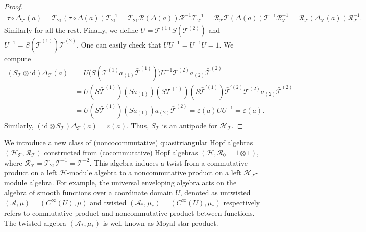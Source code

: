 \documentclass[reqno]{amsart}
\theoremstyle{definition}
\theoremstyle{remark}
\begin{document}
\begin{proof}
\begin{equation}
\begin{split}
            \tau \circ \Delta_\mathcal{T} (a) = \mathcal{T}_{21} (\tau \circ\Delta(a))\mathcal{T}_{21}^{-1} = \mathcal{T}_{21}\mathcal{R}(\Delta(a))\mathcal{R}^{-1} \mathcal{T}_{21}^{-1} = \mathcal{R}_\mathcal{T}\mathcal{T}(\Delta(a))\mathcal{T}^{-1}\mathcal{R}_\mathcal{T}^{-1} = \mathcal{R}_\mathcal{T}(\Delta_\mathcal{T}(a))\mathcal{R}_\mathcal{T}^{-1}.
        \end{split}
    \end{equation}
    Similarly for all the rest. Finally, we define $U=\mathcal{T}^{(1)} S\left(\mathcal{T}^{(2)}\right)$ and $U^{-1}=S\left(\bar{\mathcal{T}}^{(1)}\right) \bar{\mathcal{T}}^{(2)}$. One can easily check that $UU^{-1}=U^{-1}U=1$. We compute
    \begin{equation}
\begin{split}
 (S_{\mathcal{T}}\otimes \textrm{id})\Delta_{\mathcal{T}}(a)
&= U\bigl(S(\mathcal{T}^{(1)}a_{(1)}\bar{\mathcal{T}}^{(1)})\bigr)U^{-1}
   \mathcal{T}^{(2)}a_{(2)}\bar{\mathcal{T}}^{(2)} \\
&= U(S \bar{\mathcal{T}}^{(1)} )(S a_{(1)})(S\mathcal{T}^{(1)})
   (S\bar{\mathcal{T}}^{\prime(1)})\bar{\mathcal{T}}^{\prime(2)}
   \mathcal{T}^{(2)}a_{(2)}\bar{\mathcal{T}}^{(2)} \\
&= U(S \bar{\mathcal{T}}^{(1)}) (S a_{(1)}) a_{(2)} \bar{\mathcal{T}}^{(2)}
   = \varepsilon(a) U U^{-1} = \varepsilon(a).
\end{split}
\end{equation}
Similarly, $(\textrm{id}\otimes S_{\mathcal{T}})\Delta_{\mathcal{T}}(a)
=\varepsilon(a)$. Thus, $S_\mathcal{T}$ is an antipode for $\mathscr{H}_\mathcal{T}$.
\end{proof}

We introduce a new class of (noncocommutative) quasitriangular Hopf algebras $\left(\mathscr{H}_\mathcal{T}, \mathcal{R}_\mathcal{T}\right)$ constructed from (cocommutative) Hopf algebras $\left(\mathscr{H},\mathcal{R}_0=1\otimes 1\right)$, where $\mathcal{R}_\mathcal{T} = \mathcal{T}_{21}\mathcal{T}^{-1}=\mathcal{T}^{-2}$. This algebra induces a twist from a commutative product on a left $\mathscr{H}$-module algebra to a noncommutative product on a left $\mathscr{H}_\mathcal{T}$-module algebra. For example, the universal enveloping algebra acts on the algebra of smooth functions over a coordinate domain $U$, denoted as untwisted $\left(\mathscr{A},\mu\right)=\left(C^\infty(U),\mu\right)$ and twisted $\left(\mathscr{A}_*,\mu_*\right)=\left(C^\infty(U),\mu_*\right)$ respectively refers to commutative product and noncommutative product between functions. The twisted algebra $\left(\mathscr{A}_*,\mu_*\right)$ is well-known as Moyal star product. 
\end{document}
